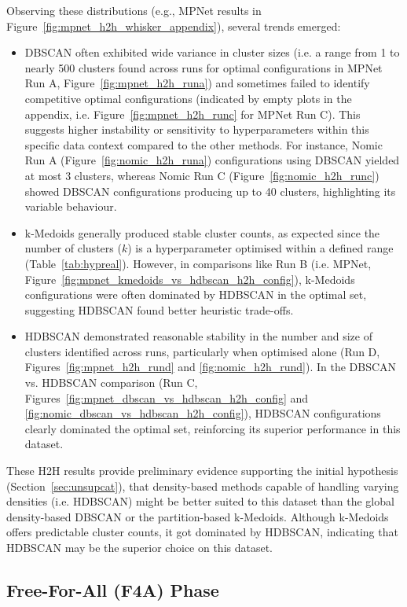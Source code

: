 \documentclass[10pt,oneside]{report}
\begin{document}
Observing these distributions (e.g., MPNet results in Figure~\ref{fig:mpnet_h2h_whisker_appendix}), several trends emerged:
\begin{itemize}
    \item DBSCAN often exhibited wide variance in cluster sizes (i.e. a range from 1 to nearly 500 clusters found across runs for optimal configurations in MPNet Run A, Figure~\ref{fig:mpnet_h2h_runa}) and sometimes failed to identify competitive optimal configurations (indicated by empty plots in the appendix, i.e. Figure~\ref{fig:mpnet_h2h_runc} for MPNet Run C). This suggests higher instability or sensitivity to hyperparameters within this specific data context compared to the other methods. For instance, Nomic Run A (Figure~\ref{fig:nomic_h2h_runa}) configurations using DBSCAN yielded at most 3 clusters, whereas Nomic Run C (Figure~\ref{fig:nomic_h2h_runc}) showed DBSCAN configurations producing up to 40 clusters, highlighting its variable behaviour.
    \item k-Medoids generally produced stable cluster counts, as expected since the number of clusters ($k$) is a hyperparameter optimised within a defined range (Table~\ref{tab:hypreal}). However, in comparisons like Run B (i.e. MPNet, Figure~\ref{fig:mpnet_kmedoids_vs_hdbscan_h2h_config}), k-Medoids configurations were often dominated by HDBSCAN in the optimal set, suggesting HDBSCAN found better heuristic trade-offs.
    \item HDBSCAN demonstrated reasonable stability in the number and size of clusters identified across runs, particularly when optimised alone (Run D, Figures~\ref{fig:mpnet_h2h_rund} and \ref{fig:nomic_h2h_rund}). In the DBSCAN vs. HDBSCAN comparison (Run C, Figures~\ref{fig:mpnet_dbscan_vs_hdbscan_h2h_config} and \ref{fig:nomic_dbscan_vs_hdbscan_h2h_config}), HDBSCAN configurations clearly dominated the optimal set, reinforcing its superior performance in this dataset. 
\end{itemize}


These H2H results provide preliminary evidence supporting the initial hypothesis (Section~\ref{sec:unsupcat}), that density-based methods capable of handling varying densities (i.e. HDBSCAN) might be better suited to this dataset than the global density-based DBSCAN or the partition-based k-Medoids. Although k-Medoids offers predictable cluster counts, it got dominated by HDBSCAN, indicating that HDBSCAN may be the superior choice on this dataset. 

\subsection{Free-For-All (F4A) Phase}\label{sec:f4a_results}
\end{document}
